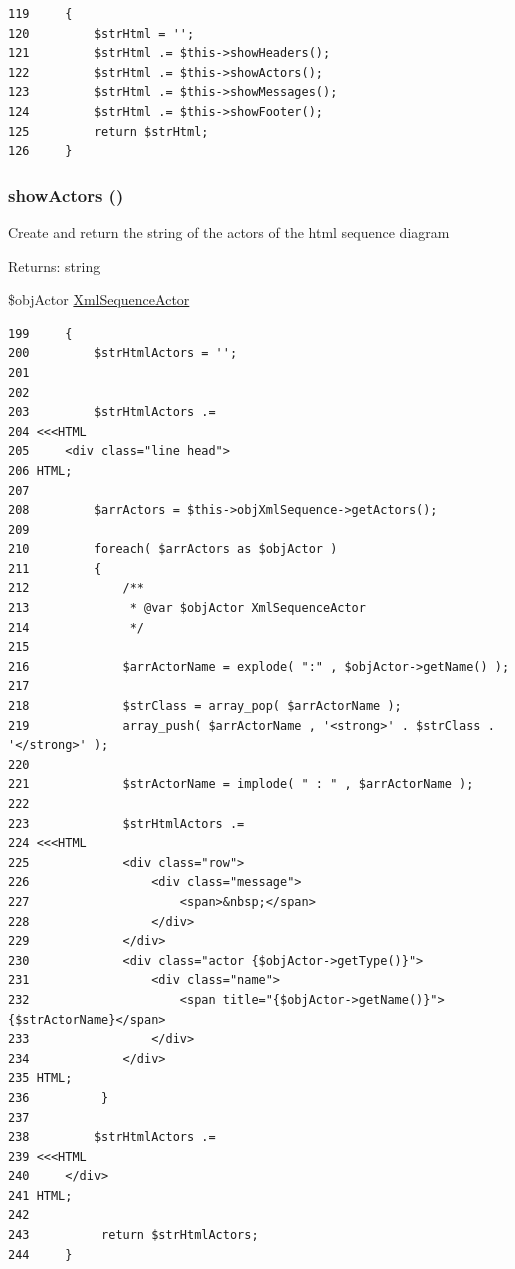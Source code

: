 \begin{Code}\begin{verbatim}119     {
120         $strHtml = '';
121         $strHtml .= $this->showHeaders();
122         $strHtml .= $this->showActors();
123         $strHtml .= $this->showMessages();
124         $strHtml .= $this->showFooter();
125         return $strHtml;
126     }
\end{verbatim}
\end{Code}


\hypertarget{class_xml_sequence_printer_diagram_2ed8b419d64f2238d2d47beda376f1f7}{
\subsubsection[{showActors}]{\setlength{\rightskip}{0pt plus 5cm}showActors ()}}
\label{class_xml_sequence_printer_diagram_2ed8b419d64f2238d2d47beda376f1f7}


Create and return the string of the actors of the html sequence diagram

\begin{Desc}
\item[Returns:]string \end{Desc}


\$objActor \hyperlink{class_xml_sequence_actor}{XmlSequenceActor}

\begin{Code}\begin{verbatim}199     {
200         $strHtmlActors = '';
201 
202 
203         $strHtmlActors .=
204 <<<HTML
205     <div class="line head">
206 HTML;
207 
208         $arrActors = $this->objXmlSequence->getActors();
209         
210         foreach( $arrActors as $objActor )
211         {
212             /**
213              * @var $objActor XmlSequenceActor
214              */
215 
216             $arrActorName = explode( ":" , $objActor->getName() );
217 
218             $strClass = array_pop( $arrActorName );
219             array_push( $arrActorName , '<strong>' . $strClass . '</strong>' );
220 
221             $strActorName = implode( " : " , $arrActorName );
222 
223             $strHtmlActors .=
224 <<<HTML
225             <div class="row">
226                 <div class="message">
227                     <span>&nbsp;</span>
228                 </div>
229             </div>
230             <div class="actor {$objActor->getType()}">
231                 <div class="name">
232                     <span title="{$objActor->getName()}">{$strActorName}</span>
233                 </div>
234             </div>
235 HTML;
236          }
237 
238         $strHtmlActors .=
239 <<<HTML
240     </div>
241 HTML;
242 
243          return $strHtmlActors;
244     }
\end{verbatim}
\end{Code}


